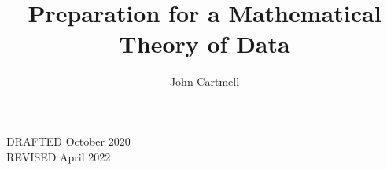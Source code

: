 \documentclass[10pt,a4paper]{article}
\theoremstyle{remark}
\begin{document}
\title{Preparation for a Mathematical Theory of Data}


\author{John Cartmell}

\date{}

\maketitle

\begin{center}
DRAFTED October 2020 \\
REVISED April 2022
\end{center}

\newcommand{\seenudgeup}[1]{\rule{0.1cm}{#1}}
\newcommand{\seenudgedown}[1]{\rule[-#1]{0.1cm}{0.1cm}}
\newcommand{\nudgeup}[1]{\rule{0cm}{#1}}
\newcommand{\nudgedown}[1]{\rule[-#1]{0cm}{0.1cm}}

\newcommand{\paralleldiag}[4]
{
 $
\rule[-0.3cm]{0pt}{0.9cm} %
\begin{array}{c p{0.5cm} c  }
 \Rnode{a}{#1}     &&   \Rnode{b}{#2}
\end{array} 
\begin{arrows}
\ncarc[nodesep=2pt,arcangle=10,offset=2pt]{->}{a}{b}
\alabel{#3}
\ncarc[nodesep=2pt,arcangle=-10,offset=-2pt]{->}{a}{b}
\blabel{#4}
\end{arrows}
$  
}


\newcommand{\sourcediag}[5]{
$
\begin{array}{c p{0.5cm} c  }
             &&   \Rnode{b}{#2} \\[0.01cm]
\Rnode{a}{#1} &&                \\[0.01cm] 
             &&   \Rnode{c}{#3} 
\end{array} 
\begin{arrows}
\ncarr{a}{b}
\alabel{#4}
\ncarr{a}{c}
\blabel{#5}
\end{arrows}
$  
}
\newcommand{\fgsourcediag}{\sourcediag{a}{b}{c}{f}{g}}

\newcommand{\fnsourceqnsource}
{
$
\begin{array}{c p{0.25cm} c  p{0.25cm} c }
             &&   \Rnode{b1}{b_1} &&              \\[0.4cm]
\Rnode{a}{a} &&                   && \Rnode{c}{c} \\[0.4cm]
             &&   \Rnode{bn}{b_n} &&              
\end{array} 
\begin{arrows}
\ncarr{a}{b1}
\alabel{f_1}
\ncarr{c}{b1}
\blabel{q_1} 
\ncarr{a}{bn}
\blabel{f_n}
\ncarr{c}{bn}
\alabel{q_n}
\end{arrows}
$   
}
\end{document}
